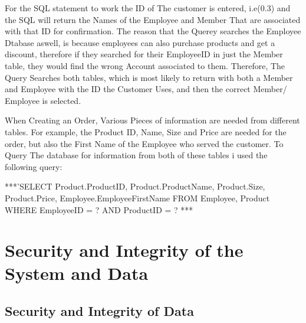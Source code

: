   For the SQL statement to work the ID of The customer is entered, i.e(0.3) and the SQL will return the Names of the Employee and Member That are associated with that ID for confirmation. The reason that the Querey searches the Employee Dtabase aswell, is because employees can also purchase products and get a discount, therefore if they searched for their EmployeeID in just the Member table, they would find the wrong Account associated to them. Therefore, The Query Searches both tables, which is most likely to return with both a Member and Employee with the ID the Customer Uses, and then the correct Member/ Employee is selected.

  When Creating an Order, Various Pieces of information are needed from different tables. For example, the Product ID, Name, Size and Price are needed for the order, but also the First Name of the Employee who served the customer. To Query The database for information from both of these tables i used the following query:
  
\begin{sql}
	***'SELECT Product.ProductID,   Product.ProductName,   Product.Size,  Product.Price, Employee.EmployeeFirstName FROM   Employee, Product  WHERE EmployeeID = ? AND ProductID = ? ***
\end{sql}
  
  
  
  
  
  
\section{Security and Integrity of the System and Data}

\subsection{Security and Integrity of Data}

